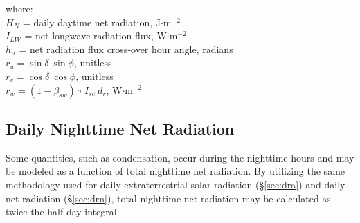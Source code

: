 \noindent where: \\
\indent $H_N$ = daily daytime net radiation, J$\cdot$m$^{-2}$ \\
\indent $I_{LW}$ = net longwave radiation flux, W$\cdot$m$^{-2}$\\
\indent $h_n$ = net radiation flux cross-over hour angle, radians\\
\indent $r_u = \sin\delta\: \sin\phi$, unitless \\
\indent $r_v = \cos\delta\: \cos\phi$, unitless \\
\indent $r_w = \left(1-\beta_{sw}\right)\:\tau\: I_{sc}\: d_r$, W$\cdot$m$^{-2}$\\

\subsection{Daily Nighttime Net Radiation}
\label{sec:drnn}
Some quantities, such as condensation, occur during the nighttime hours and may be modeled as a function of total nighttime net radiation. 
By utilizing the same methodology used for daily extraterrestrial solar radiation (\S \ref{sec:dra}) and daily net radiation (\S \ref{sec:drn}), total nighttime net radiation may be calculated as twice the half-day integral.

